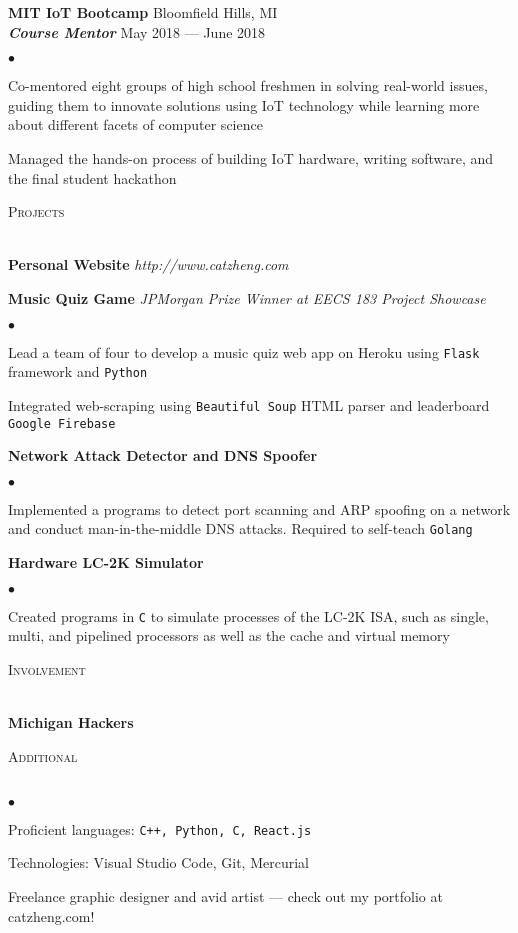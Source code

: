 \documentclass{article}
\newcommand{\lineunder}{\vspace*{-8pt} \\ \hspace*{-20pt} \hrulefill \\}
\newcommand{\header}[1]{{\hspace*{-20pt}\vspace*{6pt} \large\textsc{#1}} \vspace*{-5pt} \lineunder \vspace{3pt}}
\newcommand{\employer}[4]{{ \normalsize\textbf{#1} \small\hfill{#2}\\ {\small\textbf{\emph{#3}}} \small\hfill{#4}\\ }}
\newenvironment{achievements}{\begin{list}{$\bullet$}{\topsep 0pt \itemsep 0pt}}{\vspace*{5pt}\end{list}}
\begin{document}
\employer{MIT IoT Bootcamp}{Bloomfield Hills, MI}{Course Mentor}{May 2018 --- June 2018}
	\begin{achievements}
	\item Co-mentored eight groups of high school freshmen in solving real-world issues, guiding them to innovate solutions using IoT technology while learning more about different facets of computer science
	\item Managed the hands-on process of building IoT hardware, writing software, and the final student hackathon
	\end{achievements}

\header{Projects}

\textbf{Personal Website} \textit{http://www.catzheng.com}
\small
\vspace{3pt}

\textbf{Music Quiz Game} \textit{JPMorgan Prize Winner at EECS 183 Project Showcase}
\small
\vspace{2pt}
\begin{achievements}
\item Lead a team of four to develop a music quiz web app on Heroku using \texttt{Flask} framework and \texttt{Python}
\item Integrated web-scraping using \texttt{Beautiful Soup\texttrademark} HTML parser and leaderboard \texttt{Google Firebase\texttrademark}
\end{achievements}

\textbf{Network Attack Detector and DNS Spoofer}
\small
\vspace{2pt}
\begin{achievements}
\item Implemented a programs to detect port scanning and ARP spoofing on a network and conduct man-in-the-middle DNS attacks. Required to self-teach \texttt{Golang}
\end{achievements}

\textbf{Hardware LC-2K Simulator}
\small
\vspace{2pt}
\begin{achievements}
\item Created programs in \texttt{C} to simulate processes of the LC-2K ISA, such as single, multi, and pipelined processors as well as the cache and virtual memory
\end{achievements}

\header{Involvement}

\textbf{Michigan Hackers}
\small
\vspace{0.25cm}

\header{Additional}
\begin{achievements}
\item Proficient languages: \texttt{C++, Python, C, React.js}
\item Technologies: Visual Studio Code, Git, Mercurial
\item Freelance graphic designer and avid artist --- check out my portfolio at catzheng.com!
\end{achievements}
\end{document}
